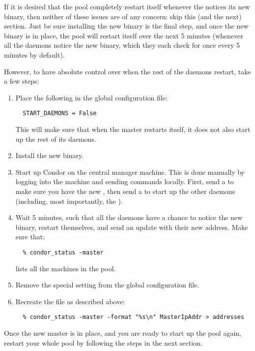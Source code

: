If it is desired that the pool completely restart itself whenever the
 notices its new binary, 
then neither of these issues are of any
concern: skip this (and the next) section.
Just be sure installing the new  binary is the final step,
and once the new binary is in place, the pool will
restart itself over the next 5 minutes (whenever all the 
daemons
notice the new binary, which they each check for once every 5 minutes
by default).

However, to have absolute control over when the rest of
the daemons restart, take a few steps:

\begin{enumerate}
\item Place the following in the global configuration file:
\begin{verbatim}
  START_DAEMONS = False
\end{verbatim}
This will make sure that when the master restarts itself, it 
does not also start up the rest of its daemons.
\item Install the new  binary.
\item Start up Condor on the central manager machine.
This is done manually by logging into the machine and
sending commands locally.
First, send a  to make sure you have the new ,
then send a  to start up the other daemons (including, most
importantly, the ).
\item Wait 5 minutes, such that all the  daemons have a chance to
notice the new binary, restart themselves, and send an update with
their new address.  Make sure that: 
\begin{verbatim}
  % condor_status -master
\end{verbatim}
lists all the machines in the pool.
\item Remove the special setting from the global configuration file.
\item Recreate the  file as described above:
\footnotesize
\begin{verbatim}
  % condor_status -master -format "%s\n" MasterIpAddr > addresses
\end{verbatim}
\normalsize
\end{enumerate}

Once the new master is in place,
and you are ready to start up the
pool again, restart your whole pool by following the
steps in the next section.

